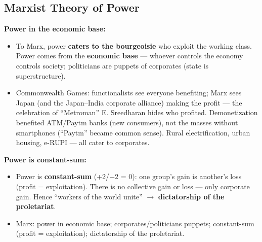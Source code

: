 \sectiondivider

\subsection{Marxist Theory of Power}

\begin{KeyConcept}
\textbf{Power in the economic base:}
\begin{itemize}
\item To Marx, power \textbf{caters to the bourgeoisie} who exploit the working class. Power comes from the \textbf{economic base} --- whoever controls the economy controls society; politicians are puppets of corporates (state is superstructure).
\end{itemize}
\end{KeyConcept}

\begin{ExampleBox}
\begin{itemize}
\item Commonwealth Games: functionalists see everyone benefiting; Marx sees Japan (and the Japan--India corporate alliance) making the profit --- the celebration of ``Metroman'' E. Sreedharan hides who profited. Demonetization benefited ATM/Paytm banks (new consumers), not the masses without smartphones (``Paytm'' became common sense). Rural electrification, urban housing, e-RUPI --- all cater to corporates.
\end{itemize}
\end{ExampleBox}

\begin{CriticalPoint}
\textbf{Power is constant-sum:}
\begin{itemize}
\item Power is \textbf{constant-sum} (+2/$-$2 = 0): one group's gain is another's loss (profit = exploitation). There is no collective gain or loss --- only corporate gain. Hence ``workers of the world unite'' $\rightarrow$ \textbf{dictatorship of the proletariat}.
\end{itemize}
\end{CriticalPoint}

\begin{QuickRevision}
\begin{itemize}
\item Marx: power in economic base; corporates/politicians puppets; constant-sum (profit = exploitation); dictatorship of the proletariat.
\end{itemize}
\end{QuickRevision}

